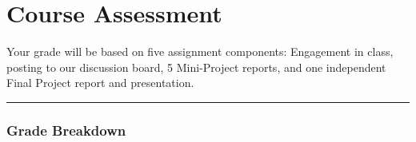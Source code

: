 \documentclass[
]{article}
\begin{document}
\hypertarget{course-assessment}{%
\section{Course Assessment}\label{course-assessment}}

Your grade will be based on five assignment components: Engagement in
class, posting to our discussion board, 5 Mini-Project reports, and one
independent Final Project report and presentation.

\begin{center}\rule{0.5\linewidth}{0.5pt}\end{center}

\hypertarget{grade-breakdown}{%
\subsubsection{Grade Breakdown}\label{grade-breakdown}}
\end{document}
